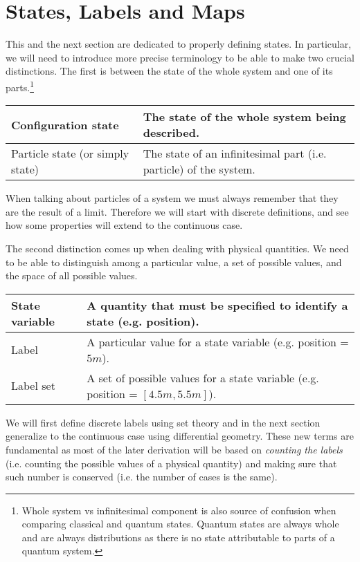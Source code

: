\documentclass[aps,pra,10pt,twocolumn,floatfix,nofootinbib]{revtex4-1}
\theoremstyle{definition}
\begin{document}
\section{States, Labels and Maps}

This and the next section are dedicated to properly defining states. In particular, we will need to introduce more precise terminology to be able to make two crucial distinctions. The first is between the state of the whole system and one of its parts.\footnote{Whole system vs infinitesimal component is also source of confusion when comparing classical and quantum states. Quantum states are always whole and are always distributions as there is no state attributable to parts of a quantum system.}
\begin{center}
    \begin{tabular}{ | p{2.5cm} | p{5.5cm} | }
    \hline
    Configuration state & The state of the whole system being described. \\ \hline
    Particle state (or simply state) & The state of an infinitesimal part (i.e. particle) of the system. \\ \hline
    \end{tabular}
\end{center}
When talking about particles of a system we must always remember that they are the result of a limit. Therefore we will start with discrete definitions, and see how some properties will extend to the continuous case.

The second distinction comes up when dealing with physical quantities. We need to be able to distinguish among a particular value, a set of possible values, and the space of all possible values.
\begin{center}
    \begin{tabular}{ | p{2.5cm} | p{5.5cm} | }
    \hline
    State variable & A quantity that must be specified to identify a state (e.g. position). \\ \hline
    Label & A particular value for a state variable (e.g. position = $5m$). \\ \hline
    Label set & A set of possible values for a state variable (e.g. position = $[4.5m, 5.5m]$). \\
    \hline
    \end{tabular}
\end{center}

We will first define discrete labels using set theory and in the next section generalize to the continuous case using differential geometry. These new terms are fundamental as most of the later derivation will be based on \emph{counting the labels} (i.e. counting the possible values of a physical quantity) and making sure that such number is conserved (i.e. the number of cases is the same).
\end{document}
